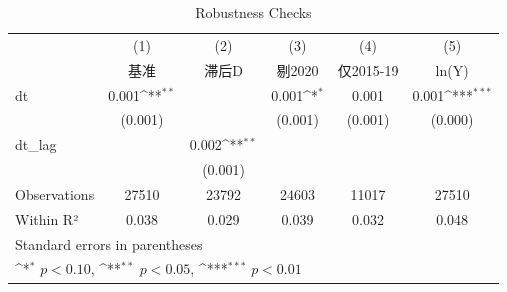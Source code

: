 \begin{table}[htbp]\centering\small
\def\sym#1{\ifmmode^{#1}\else\(^{#1}\)\fi}
\caption{Robustness Checks}
\begin{tabular}{l*{5}{c}}
\hline\hline
            &\multicolumn{1}{c}{(1)}&\multicolumn{1}{c}{(2)}&\multicolumn{1}{c}{(3)}&\multicolumn{1}{c}{(4)}&\multicolumn{1}{c}{(5)}\\
            &\multicolumn{1}{c}{基准}&\multicolumn{1}{c}{滞后D}&\multicolumn{1}{c}{剔2020}&\multicolumn{1}{c}{仅2015-19}&\multicolumn{1}{c}{ln(Y)}\\
\hline
dt          &       0.001\sym{**} &                     &       0.001\sym{*}  &       0.001         &       0.001\sym{***}\\
            &     (0.001)         &                     &     (0.001)         &     (0.001)         &     (0.000)         \\
dt\_lag      &                     &       0.002\sym{**} &                     &                     &                     \\
            &                     &     (0.001)         &                     &                     &                     \\
\hline
Observations&       27510         &       23792         &       24603         &       11017         &       27510         \\
Within R²   &       0.038         &       0.029         &       0.039         &       0.032         &       0.048         \\
\hline\hline
\multicolumn{6}{l}{\footnotesize Standard errors in parentheses}\\
\multicolumn{6}{l}{\footnotesize \sym{*} \(p<0.10\), \sym{**} \(p<0.05\), \sym{***} \(p<0.01\)}\\
\end{tabular}
\end{table}
